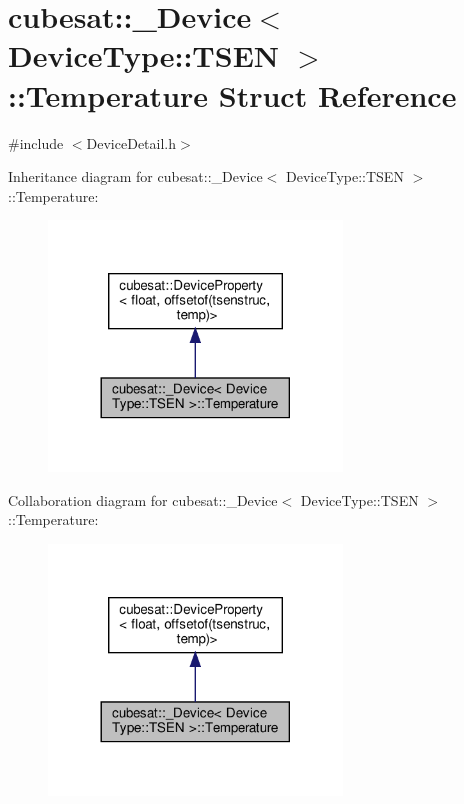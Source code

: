 \hypertarget{structcubesat_1_1__Device_3_01DeviceType_1_1TSEN_01_4_1_1Temperature}{}\section{cubesat\+:\+:\+\_\+\+Device$<$ Device\+Type\+:\+:T\+S\+EN $>$\+:\+:Temperature Struct Reference}
\label{structcubesat_1_1__Device_3_01DeviceType_1_1TSEN_01_4_1_1Temperature}


{\ttfamily \#include $<$Device\+Detail.\+h$>$}



Inheritance diagram for cubesat\+:\+:\+\_\+\+Device$<$ Device\+Type\+:\+:T\+S\+EN $>$\+:\+:Temperature\+:\nopagebreak
\begin{figure}[H]
\begin{center}
\leavevmode
\includegraphics[width=221pt]{structcubesat_1_1__Device_3_01DeviceType_1_1TSEN_01_4_1_1Temperature__inherit__graph}
\end{center}
\end{figure}


Collaboration diagram for cubesat\+:\+:\+\_\+\+Device$<$ Device\+Type\+:\+:T\+S\+EN $>$\+:\+:Temperature\+:\nopagebreak
\begin{figure}[H]
\begin{center}
\leavevmode
\includegraphics[width=221pt]{structcubesat_1_1__Device_3_01DeviceType_1_1TSEN_01_4_1_1Temperature__coll__graph}
\end{center}
\end{figure}
